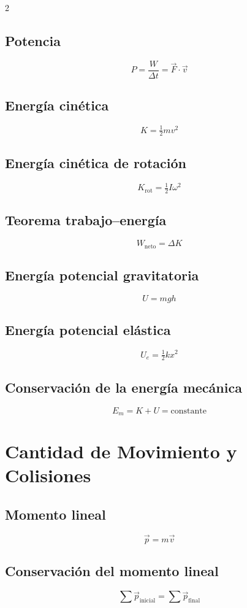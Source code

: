 \documentclass[10pt]{article}
\begin{document}
\begin{multicols}{2}
\subsection*{Potencia}
\[
P = \frac{W}{\Delta t} = \vec{F} \cdot \vec{v}
\]

\subsection*{Energía cinética}
\[
K = \tfrac{1}{2} m v^2
\]

\subsection*{Energía cinética de rotación}
\[
K_{\text{rot}} = \tfrac{1}{2} I \omega^2
\]

\subsection*{Teorema trabajo–energía}
\[
W_{\text{neto}} = \Delta K
\]

\subsection*{Energía potencial gravitatoria}
\[
U = m g h
\]

\subsection*{Energía potencial elástica}
\[
U_e = \tfrac{1}{2} k x^2
\]

\subsection*{Conservación de la energía mecánica}
\[
E_m = K + U = \text{constante}
\]

\section*{Cantidad de Movimiento y Colisiones}

\subsection*{Momento lineal}
\[
\vec{p} = m \vec{v}
\]

\subsection*{Conservación del momento lineal}
\[
\sum \vec{p}_{\text{inicial}} = \sum \vec{p}_{\text{final}}
\]


\end{multicols}
\end{document}

